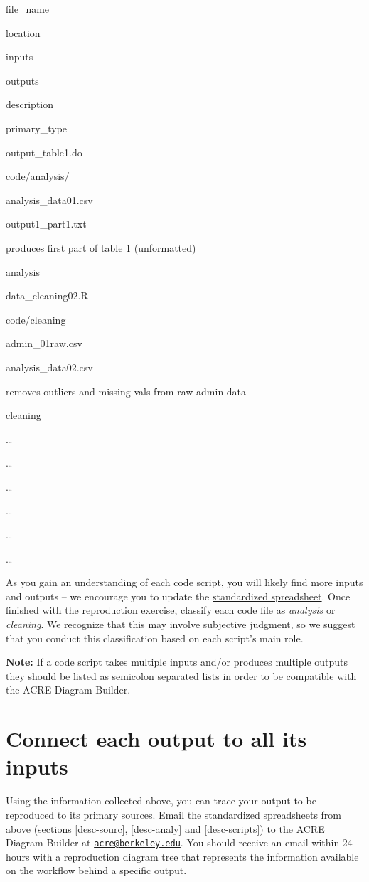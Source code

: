 \documentclass[]{book}
\begin{document}
file\_name

location

inputs

outputs

description

primary\_type

output\_table1.do

code/analysis/

analysis\_data01.csv

output1\_part1.txt

produces first part of table 1 (unformatted)

analysis

data\_cleaning02.R

code/cleaning

admin\_01raw.csv

analysis\_data02.csv

removes outliers and missing vals from raw admin data

cleaning

\ldots{}

\ldots{}

\ldots{}

\ldots{}

\ldots{}

\ldots{}

As you gain an understanding of each code script, you will likely find more inputs and outputs -- we encourage you to update the \href{https://docs.google.com/spreadsheets/d/1LUIdVFH0OfR70C7z07TYeE-uWzKI_JIeWUMaYhqEKK0/edit\#gid=1617799822\&range=A1}{standardized spreadsheet}. Once finished with the reproduction exercise, classify each code file as \emph{analysis} or \emph{cleaning}. We recognize that this may involve subjective judgment, so we suggest that you conduct this classification based on each script's main role.

\textbf{Note:} If a code script takes multiple inputs and/or produces multiple outputs they should be listed as semicolon separated lists in order to be compatible with the ACRE Diagram Builder.

\hypertarget{diagram}{%
\section{Connect each output to all its inputs}\label{diagram}}

Using the information collected above, you can trace your output-to-be-reproduced to its primary sources. Email the standardized spreadsheets from above (sections \ref{desc-sourc}, \ref{desc-analy} and \ref{desc-scripts}) to the ACRE Diagram Builder at \href{mailto:acre@berkeley.edu}{\nolinkurl{acre@berkeley.edu}}. You should receive an email within 24 hours with a reproduction diagram tree that represents the information available on the workflow behind a specific output.
\end{document}
